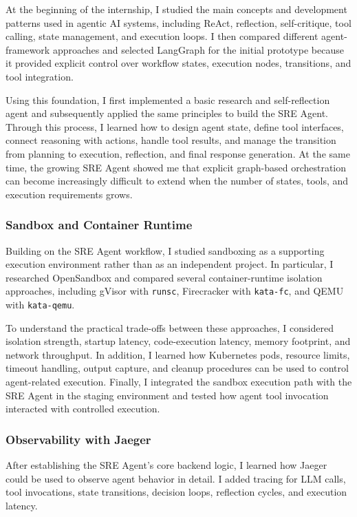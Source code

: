 \documentclass[a4paper]{article}
\theoremstyle{definition}
\begin{document}
At the beginning of the internship, I studied the main concepts and development patterns used in agentic AI systems, including ReAct, reflection, self-critique, tool calling, state management, and execution loops. I then compared different agent-framework approaches and selected LangGraph for the initial prototype because it provided explicit control over workflow states, execution nodes, transitions, and tool integration.

Using this foundation, I first implemented a basic research and self-reflection agent and subsequently applied the same principles to build the SRE Agent. Through this process, I learned how to design agent state, define tool interfaces, connect reasoning with actions, handle tool results, and manage the transition from planning to execution, reflection, and final response generation. At the same time, the growing SRE Agent showed me that explicit graph-based orchestration can become increasingly difficult to extend when the number of states, tools, and execution requirements grows.

\subsubsection{Sandbox and Container Runtime}

Building on the SRE Agent workflow, I studied sandboxing as a supporting execution environment rather than as an independent project. In particular, I researched OpenSandbox and compared several container-runtime isolation approaches, including gVisor with \texttt{runsc}, Firecracker with \texttt{kata-fc}, and QEMU with \texttt{kata-qemu}.

To understand the practical trade-offs between these approaches, I considered isolation strength, startup latency, code-execution latency, memory footprint, and network throughput. In addition, I learned how Kubernetes pods, resource limits, timeout handling, output capture, and cleanup procedures can be used to control agent-related execution. Finally, I integrated the sandbox execution path with the SRE Agent in the staging environment and tested how agent tool invocation interacted with controlled execution.

\subsubsection{Observability with Jaeger}

After establishing the SRE Agent's core backend logic, I learned how Jaeger could be used to observe agent behavior in detail. I added tracing for LLM calls, tool invocations, state transitions, decision loops, reflection cycles, and execution latency.
\end{document}
